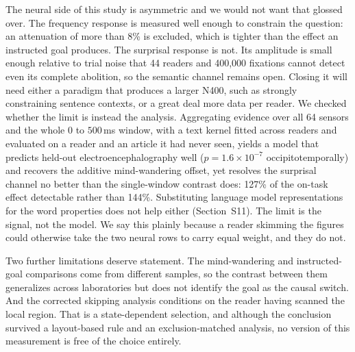 \documentclass[11pt]{article}
\begin{document}
The neural side of this study is asymmetric and we would not want that glossed over. The
frequency response is measured well enough to constrain the question: an attenuation of more
than 8\% is excluded, which is tighter than the effect an instructed goal produces. The
surprisal response is not. Its amplitude is small enough relative to trial noise that 44 readers
and 400,000 fixations cannot detect even its complete abolition, so the semantic channel remains
open. Closing it will need either a paradigm that produces a larger N400, such as strongly
constraining sentence contexts, or a great deal more data per reader. We checked whether the
limit is instead the analysis. Aggregating evidence over all 64 sensors and the whole $0$ to
$500$\,\si{\milli\second} window, with a text kernel fitted across readers and evaluated on a
reader and an article it had never seen, yields a model that predicts held-out
electroencephalography well ($p=1.6\times10^{-7}$ occipitotemporally) and recovers the additive
mind-wandering offset, yet resolves the surprisal channel no better than the single-window
contrast does: 127\% of the on-task effect detectable rather than 144\%. Substituting language
model representations for the word properties does not help either (Section~S11). The limit is
the signal, not the model. We say this plainly
because a reader skimming the figures could otherwise take the two neural rows to carry equal
weight, and they do not.

Two further limitations deserve statement. The mind-wandering and instructed-goal comparisons
come from different samples, so the contrast between them generalizes across laboratories but
does not identify the goal as the causal switch. And the corrected skipping analysis conditions on the reader having scanned the local region.
That is a state-dependent selection, and although the conclusion survived a layout-based rule
and an exclusion-matched analysis, no version of this measurement is free of the choice
entirely.
\end{document}
